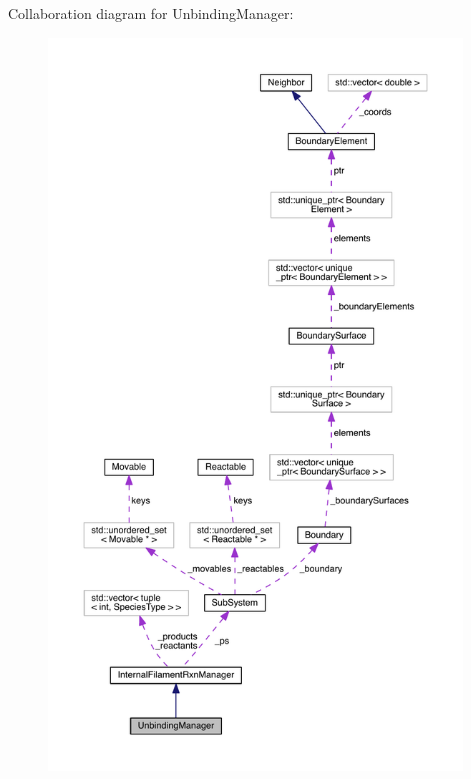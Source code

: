 Collaboration diagram for Unbinding\+Manager\+:
\nopagebreak
\begin{figure}[H]
\begin{center}
\leavevmode
\includegraphics[height=550pt]{classUnbindingManager__coll__graph}
\end{center}
\end{figure}

